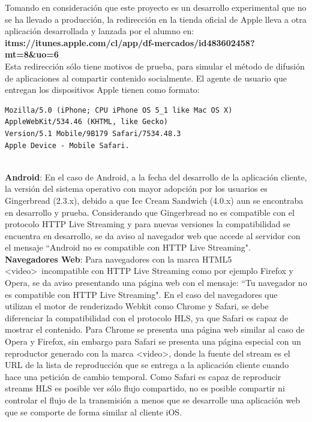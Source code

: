 Tomando en consideración que este proyecto es un desarrollo experimental que no se ha llevado a producción, la redirección en la tienda oficial de Apple lleva a otra aplicación desarrollada y lanzada por el alumno en: \textbf{itms://itunes.apple.com/cl/app/df-mercados/id483602458?mt=8\&uo=6} \\
Esta redirección sólo tiene motivos de prueba, para simular el método de difusión de aplicaciones al compartir contenido socialmente.
El agente de usuario que entregan los dispositivos Apple tienen como formato: 
	\begin {lstlisting}
Mozilla/5.0 (iPhone; CPU iPhone OS 5_1 like Mac OS X) 
AppleWebKit/534.46 (KHTML, like Gecko) 
Version/5.1 Mobile/9B179 Safari/7534.48.3
Apple Device - Mobile Safari.
\end{lstlisting} 
~\\ %

\textbf{Android}: En el caso de Android, a la fecha del desarrollo de la aplicación cliente, la versión del sistema operativo con mayor adopción por los usuarios es Gingerbread (2.3.x), debido a que Ice Cream Sandwich (4.0.x) aun se encontraba en desarrollo y prueba. Considerando que Gingerbread no es compatible con el protocolo HTTP Live Streaming y para nuevas versiones la compatibilidad se encuentra en desarrollo, se da aviso al navegador web que accede al servidor con el mensaje \textquotedblleft Android no es compatible con HTTP Live Streaming".\\

\textbf{Navegadores Web}:
Para navegadores con la marca HTML5 \textless video\textgreater \ incompatible con HTTP Live Streaming como por ejemplo Firefox y Opera, se da aviso presentando una página web con el mensaje: \textquotedblleft Tu navegador no es compatible con HTTP Live Streaming".
En el caso del navegadores que utilizan el motor de renderizado Webkit como Chrome y Safari, se debe diferenciar la compatibilidad con el protocolo HLS, ya que Safari es capaz de mostrar el contenido. Para Chrome se presenta una página web similar al caso de Opera y Firefox, sin embargo para Safari se presenta una página especial con un reproductor generado con la marca \textless video\textgreater , donde la fuente del stream es el URL de la lista de reproducción que se entrega a la aplicación cliente cuando hace una petición de cambio temporal. Como Safari es capaz de reproducir streams HLS es posible ver sólo flujo compartido, no es posible compartir ni controlar el flujo de la transmisión a menos que se desarrolle una aplicación web que se comporte de forma similar al cliente iOS.



		
		